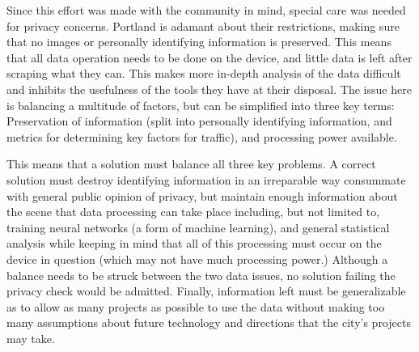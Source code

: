 \documentclass[journal,draftclsnofoot,onecolumn]{IEEEtran}
\begin{document}
    Since this effort was made with the community in mind, special care was 
    needed for privacy concerns. Portland is adamant about their restrictions, 
    making sure that no images or personally identifying information is preserved. 
    This means that all data operation needs to be done on the device, and little 
    data is left after scraping what they can. This makes more in-depth analysis 
    of the data difficult and inhibits the usefulness of the tools they have at 
    their disposal. The issue here is balancing a multitude of factors, but can be 
    simplified into three key terms: Preservation of information (split into 
    personally identifying information, and metrics for determining key factors for 
    traffic), and processing power available.

    This means that a solution must balance all three key problems. A correct 
    solution must destroy identifying information in an irreparable way consummate 
    with general public opinion of privacy, but maintain enough information about 
    the scene that data processing can take place including, but not limited to, 
    training neural networks (a form of machine learning), and general statistical 
    analysis while keeping in mind that all of this processing must occur on the 
    device in question (which may not have much processing power.) Although a 
    balance needs to be struck between the two data issues, no solution failing 
    the privacy check would be admitted. Finally, information left must be 
    generalizable as to allow as many projects as possible to use the data without 
    making too many assumptions about future technology and directions that the 
    city’s projects may take.\\
    
    
    
\end{document}
